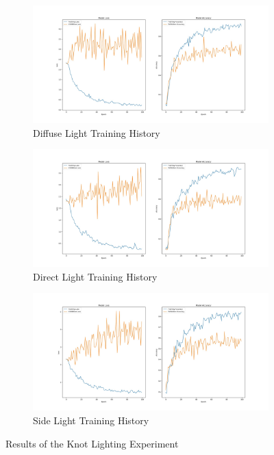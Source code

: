 \documentclass{l4proj}
\begin{document}
\begin{figure}[h]
	\begin{subfigure}{\textwidth}
		\centering
        \includegraphics[width=.8\linewidth]{eval/diffuseLightResult}
        \caption{Diffuse Light Training History}
        \label{fig:DiffuseLightingExperiment}
	\end{subfigure}
	\begin{subfigure}{\textwidth}
		\centering
        \includegraphics[width=.8\linewidth]{eval/aboveLightResult}
        \caption{Direct Light Training History}
        \label{fig:AboveLightingExperiment}
	\end{subfigure}
	\begin{subfigure}{\textwidth}
		\centering
        \includegraphics[width=.8\linewidth]{eval/sideLightResult}
        \caption{Side Light Training History}
        \label{fig:SideLightingExperiment}
	\end{subfigure}
	\caption{Results of the Knot Lighting Experiment}
    \label{fig:KnotLightingResults}
\end{figure}
\end{document}

